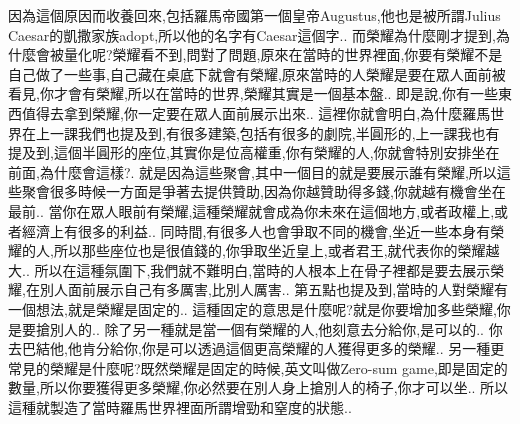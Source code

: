 \documentclass{book}
\begin{document}
因為這個原因而收養回來,包括羅馬帝國第一個皇帝Augustus,他也是被所謂Julius Caesar的凱撒家族adopt,所以他的名字有Caesar這個字..
而榮耀為什麼剛才提到,為什麼會被量化呢?榮耀看不到,問對了問題,原來在當時的世界裡面,你要有榮耀不是自己做了一些事,自己藏在桌底下就會有榮耀,原來當時的人榮耀是要在眾人面前被看見,你才會有榮耀,所以在當時的世界,榮耀其實是一個基本盤..
即是說,你有一些東西值得去拿到榮耀,你一定要在眾人面前展示出來..
這裡你就會明白,為什麼羅馬世界在上一課我們也提及到,有很多建築,包括有很多的劇院,半圓形的,上一課我也有提及到,這個半圓形的座位,其實你是位高權重,你有榮耀的人,你就會特別安排坐在前面,為什麼會這樣?.
就是因為這些聚會,其中一個目的就是要展示誰有榮耀,所以這些聚會很多時候一方面是爭著去提供贊助,因為你越贊助得多錢,你就越有機會坐在最前..
當你在眾人眼前有榮耀,這種榮耀就會成為你未來在這個地方,或者政權上,或者經濟上有很多的利益..
同時間,有很多人也會爭取不同的機會,坐近一些本身有榮耀的人,所以那些座位也是很值錢的,你爭取坐近皇上,或者君王,就代表你的榮耀越大..
所以在這種氛圍下,我們就不難明白,當時的人根本上在骨子裡都是要去展示榮耀,在別人面前展示自己有多厲害,比別人厲害..
第五點也提及到,當時的人對榮耀有一個想法,就是榮耀是固定的..
這種固定的意思是什麼呢?就是你要增加多些榮耀,你是要搶別人的..
除了另一種就是當一個有榮耀的人,他刻意去分給你,是可以的..
你去巴結他,他肯分給你,你是可以透過這個更高榮耀的人獲得更多的榮耀..
另一種更常見的榮耀是什麼呢?既然榮耀是固定的時候,英文叫做Zero-sum game,即是固定的數量,所以你要獲得更多榮耀,你必然要在別人身上搶別人的椅子,你才可以坐..
所以這種就製造了當時羅馬世界裡面所謂增勁和窒度的狀態..
\end{document}
